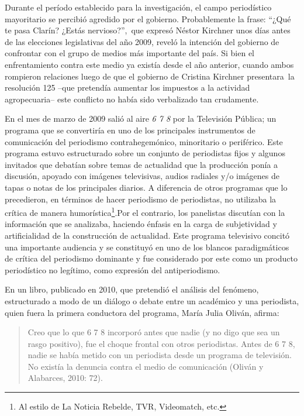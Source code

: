Durante el período establecido para la investigación, el campo periodístico mayoritario se percibió agredido por el gobierno. Probablemente la frase: ``¿Qué te pasa Clarín? ¿Estás nervioso?'',~que expresó Néstor Kirchner unos días antes de las elecciones legislativas del año 2009, reveló la intención del gobierno de confrontar con el grupo de medios más importante del país. Si bien el enfrentamiento contra este medio ya existía desde el año anterior, cuando ambos rompieron relaciones luego de que el gobierno de Cristina Kirchner presentara~la resolución 125 --que pretendía aumentar los impuestos a la actividad agropecuaria-- este conflicto no había sido verbalizado tan crudamente.

En el mes de marzo de 2009 salió al aire \emph{6 7 8} por la Televisión Pública; un programa que se convertiría en uno de los principales instrumentos de comunicación del periodismo contrahegemónico, minoritario o periférico. Este programa estuvo estructurado sobre un conjunto de periodistas fijos y algunos invitados que debatían sobre temas de actualidad que la producción ponía a discusión, apoyado con imágenes televisivas, audios radiales y/o imágenes de tapas o notas de los principales diarios. A diferencia de otros programas que lo precedieron, en términos de hacer periodismo de periodistas, no utilizaba la crítica de manera humorística\footnote{Al estilo de La Noticia Rebelde, TVR, Videomatch, etc.}.Por el contrario, los panelistas discutían con la información que se analizaba, haciendo énfasis en la carga de subjetividad y artificialidad de la construcción de actualidad. Este programa televisivo concitó una importante audiencia y se constituyó en uno de los blancos paradigmáticos de crítica del periodismo dominante y fue considerado por este como un producto periodístico no legítimo, como expresión del antiperiodismo.

En un libro, publicado en 2010, que pretendió el análisis del fenómeno, estructurado a modo de un diálogo o debate entre un académico y una periodista, quien fuera la primera conductora del programa, María Julia Oliván, afirma:

\begin{quote}
Creo que lo que 6 7 8 incorporó antes que nadie (y no digo que sea un rasgo positivo), fue el choque frontal con otros periodistas. Antes de 6 7 8, nadie se había metido con un periodista desde un programa de televisión. No existía la denuncia contra el medio de comunicación (Oliván y Alabarces, 2010: 72).
\end{quote}

